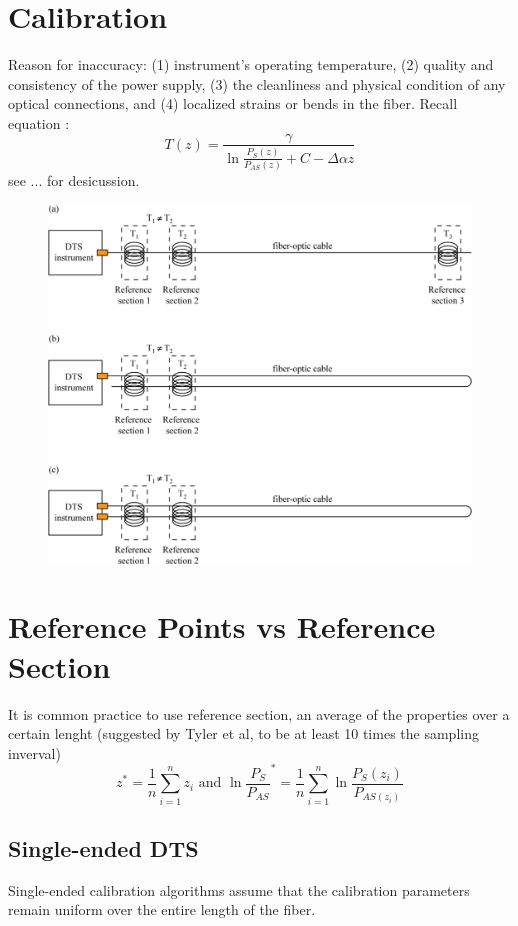 \documentclass[twocolumn]{article}
\numberwithin{equation}{section}
\begin{document}
\newpage
\section{Calibration}
Reason for inaccuracy: (1) instrument’s operating temperature, (2) quality and consistency of the power supply, (3) the cleanliness and physical condition of any optical connections, and (4) localized strains or bends in the fiber. Recall equation :
$$ T(z) = \frac{\gamma}{\ln\frac{P_S(z)}{P_{AS}(z)} + C - \Delta\alpha z}$$
see ... for desicussion.

\begin{figure}[H]
	\centering
	\includegraphics[width=.5\textwidth]{sensors-11-10859f1-1024.png}
\end{figure}

\section{Reference Points vs Reference Section}
It is common practice to use reference section, an average of the properties over a certain lenght (suggested by Tyler et al, to be at least 10 times the sampling inverval)
$$z^*=\frac{1}{n} \sum_{i=1}^n z_i \text{ and } {\ln\frac{P_S}{P_{AS}}}^*=\frac{1}{n} \sum_{i=1}^n \ln\frac{P_S(z_i)}{P_{AS(z_i)}}$$

\subsection{Single-ended DTS}
Single-ended calibration algorithms assume that the calibration parameters remain uniform over the entire length of the fiber.
\end{document}
